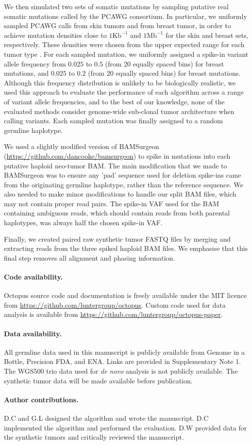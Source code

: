 \documentclass[notitlepage, twocolumn, 10pt]{article}
\begin{document}
We then simulated two sets of somatic mutations by sampling putative real somatic mutations called by the PCAWG consortium. In particular, we uniformly sampled PCAWG calls from skin tumors and from breast tumor, in order to achieve mutation densities close to $1\text{Kb}^{-1}$ and $1\text{Mb}^{-1}$ for the skin and breast sets, respectively. These densities were chosen from the upper expected range for each tumor type \cite{RN86}. For each sampled mutation, we uniformly assigned a spike-in variant allele frequency from $0.025$ to $0.5$ (from 20 equally spaced bins) for breast mutations, and $0.025$ to $0.2$ (from 20 equally spaced bins) for breast mutations. Although this frequency distribution is unlikely to be biologically realistic, we used this approach to evaluate the performance of each algorithm across a range of variant allele frequencies, and to the best of our knowledge, none of the evaluated methods consider genome-wide sub-clonal tumor architecture when calling variants. Each sampled mutation was finally assigned to a random germline haplotype.

We used a slightly modified version of BAMSurgeon (\url{https://github.com/dancooke/bamsurgeon}) to spike in mutations into each putative haploid neo-tumor BAM. The main modification that we made to BAMSurgeon was to ensure any 'pad' sequence used for deletion spike-ins came from the originating germline haplotype, rather than the reference sequence. We also needed to make minor modifications to handle our split BAM files, which may not contain proper read pairs. The spike-in VAF used for the BAM containing ambiguous reads, which should contain reads from both parental haplotypes, was always half the chosen spike-in VAF.

Finally, we created paired raw synthetic tumor FASTQ files by merging and extracting reads from the three spiked haploid BAM files. We emphasise that this final step removes all alignment and phasing information.

\paragraph*{Code availability.} Octopus source code and documentation is freely available under the MIT licence from \url{https://github.com/luntergroup/octopus}. Custom code used for data analysis is available from \url{https://github.com/luntergroup/octopus-paper}.

\paragraph*{Data availability.} All germline data used in this manuscript is publicly available from Genome in a Bottle, Precision FDA, and ENA. Links are provided in Supplementary Note 1. The WGS500 trio data used for \textit{de novo} analysis is not publicly available. The synthetic tumor data will be made available before publication.

\paragraph*{Author contributions.} D.C and G.L designed the algorithm and wrote the manuscript. D.C implemented the algorithm and performed the evaluation. D.W provided data for the synthetic tumors and critically reviewed the manuscript. 
\end{document}
